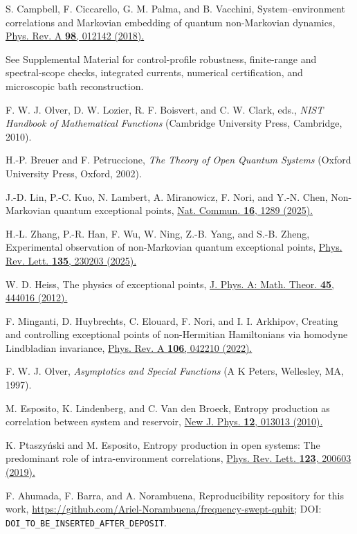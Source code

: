 \documentclass[reprint,superscriptaddress,floatfix,amsmath,amssymb,prresearch,aps]{revtex4-2}
\newcommand{\doilink}[2]{\href{https://doi.org/#1}{#2}}
\begin{document}
\begin{thebibliography}{99}
S. Campbell, F. Ciccarello, G. M. Palma, and B. Vacchini,
System--environment correlations and Markovian embedding of quantum
non-Markovian dynamics,
\doilink{10.1103/PhysRevA.98.012142}{Phys. Rev. A \textbf{98}, 012142 (2018).}

See Supplemental Material for control-profile robustness, finite-range and
spectral-scope checks, integrated currents, numerical certification, and
microscopic bath reconstruction.

F. W. J. Olver, D. W. Lozier, R. F. Boisvert, and C. W. Clark, eds.,
\textit{NIST Handbook of Mathematical Functions}
(Cambridge University Press, Cambridge, 2010).

H.-P. Breuer and F. Petruccione,
\textit{The Theory of Open Quantum Systems}
(Oxford University Press, Oxford, 2002).

J.-D. Lin, P.-C. Kuo, N. Lambert, A. Miranowicz, F. Nori, and Y.-N. Chen,
Non-Markovian quantum exceptional points,
\doilink{10.1038/s41467-025-56242-w}{Nat. Commun. \textbf{16}, 1289 (2025).}

H.-L. Zhang, P.-R. Han, F. Wu, W. Ning, Z.-B. Yang, and S.-B. Zheng,
Experimental observation of non-Markovian quantum exceptional points,
\doilink{10.1103/jk6y-55xp}{Phys. Rev. Lett. \textbf{135}, 230203 (2025).}

W. D. Heiss,
The physics of exceptional points,
\doilink{10.1088/1751-8113/45/44/444016}{J. Phys. A: Math. Theor. \textbf{45}, 444016 (2012).}

F. Minganti, D. Huybrechts, C. Elouard, F. Nori, and I. I. Arkhipov,
Creating and controlling exceptional points of non-Hermitian Hamiltonians via
homodyne Lindbladian invariance,
\doilink{10.1103/PhysRevA.106.042210}{Phys. Rev. A \textbf{106}, 042210 (2022).}

F. W. J. Olver,
\textit{Asymptotics and Special Functions}
(A K Peters, Wellesley, MA, 1997).

M. Esposito, K. Lindenberg, and C. Van den Broeck,
Entropy production as correlation between system and reservoir,
\doilink{10.1088/1367-2630/12/1/013013}{New J. Phys. \textbf{12}, 013013 (2010).}

K. Ptaszy\'nski and M. Esposito,
Entropy production in open systems: The predominant role of
intra-environment correlations,
\doilink{10.1103/PhysRevLett.123.200603}{Phys. Rev. Lett. \textbf{123}, 200603 (2019).}

F. Ahumada, F. Barra, and A. Norambuena,
Reproducibility repository for this work,
\url{https://github.com/Ariel-Norambuena/frequency-swept-qubit};
DOI: \texttt{DOI\_TO\_BE\_INSERTED\_AFTER\_DEPOSIT}.

\end{thebibliography}
\end{document}
